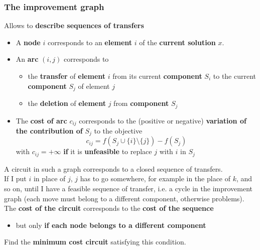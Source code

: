 \documentclass[11pt]{article}
\begin{document}
	\newpage
	
	\subsubsection{The improvement graph} 
	Allows to \textbf{describe sequences of transfers}
	\begin{itemize}
		\item A \textbf{node} $i$ corresponds to an \textbf{element} $i$ of the \textbf{current solution} $x$.\\
		
		\item An \textbf{arc} $(i, j)$ corresponds to
		\begin{itemize}
			\item the \textbf{transfer} of \textbf{element} $i$ from its current \textbf{component} $S_i$ to the current \textbf{component} $S_j$ of element $j$
			\item the \textbf{deletion} of \textbf{element} $j$ from \textbf{component} $S_j$
		\end{itemize}
		\nn
		
		\item The \textbf{cost of arc} $c_{ij}$ corresponds to the (positive or negative) \textbf{variation of the contribution of} $S_j$ to the objective
		$$ c_{ij} = f (S_j \cup \{i\} \setminus \{j\}) - f (S_j) $$
		with $c_{ij} = +\infty$ \textbf{if} it is \textbf{unfeasible} to replace $j$ with $i$ in $S_j$
	\end{itemize}
	
	A circuit in such a graph corresponds to a closed sequence of transfers.\\
	
	If I put $i$ in place of $j$, $j$ has to go somewhere, for example in the place of $k$, and so on, until I have a feasible sequence of transfer, i.e. a cycle in the improvement graph (each move must belong to a different component, otherwise problems).\\
	
	The \textbf{cost of the circuit} corresponds to the \textbf{cost of the sequence}
	\begin{itemize}
		\item but only \textbf{if each node belongs to a different component}
	\end{itemize}
	
	Find the \textbf{minimum cost circuit} satisfying this condition.\\
	
\end{document}
